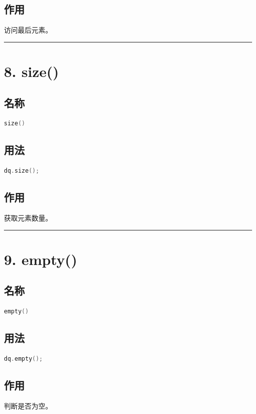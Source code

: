 \documentclass[9pt,twocolumn]{extarticle}
\begin{document}
\subsection{作用}
访问最后元素。

\noindent\rule{\linewidth}{0.4pt}

\section{8. size()}

\subsection{名称}
\begin{lstlisting}[language=C++]
size()
\end{lstlisting}

\subsection{用法}
\begin{lstlisting}[language=C++]
dq.size();
\end{lstlisting}

\subsection{作用}
获取元素数量。

\noindent\rule{\linewidth}{0.4pt}

\section{9. empty()}

\subsection{名称}
\begin{lstlisting}[language=C++]
empty()
\end{lstlisting}

\subsection{用法}
\begin{lstlisting}[language=C++]
dq.empty();
\end{lstlisting}

\subsection{作用}
判断是否为空。
\end{document}
